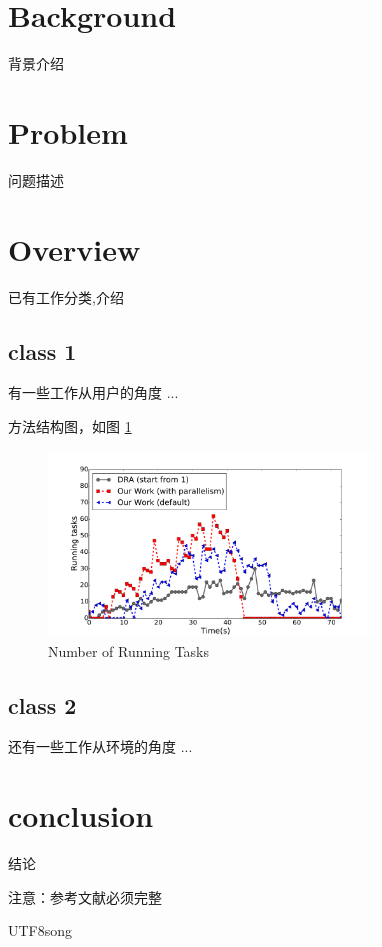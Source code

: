 \documentclass[sigconf]{acmart}
\begin{document}
\begin{CJK}{UTF8}{song}
\maketitle

\section{Background} %
背景介绍

\section{Problem}
问题描述

\section{Overview}
已有工作分类,介绍

\subsection{class 1}
有一些工作从用户的角度 ...



方法结构图，如图 \ref{fig:tasks} 
\begin{figure}[htbp]
\centering
\includegraphics[width=3.4in]{./figure/tasks.pdf}
\caption{Number of Running Tasks}\label{fig:tasks}
\end{figure}

\subsection{class 2}
还有一些工作从环境的角度 ...

\section{conclusion}
结论

注意：参考文献必须完整



 

\end{CJK}{UTF8}{song}
\end{document}
